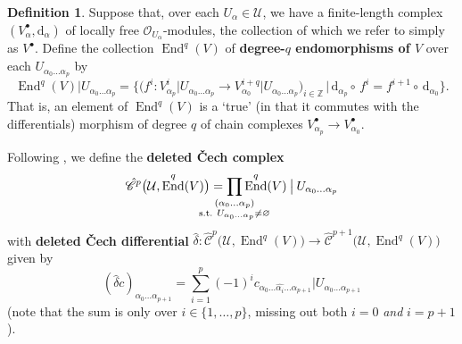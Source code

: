 \documentclass[11pt,fleqn]{article}
\theoremstyle{plain}
\theoremstyle{definition}
\newtheorem{definition}[theorem]{Definition}
\theoremstyle{remark}
\numberwithin{equation}{theorem}
\newcommand{\cover}{\mathcal{U}}
\newcommand{\OO}{\mathcal{O}}
\newcommand{\restricted}{\mathbin{\big\vert}}
\newcommand{\cechd}{\hat{\mathscr{C}}}
\newcommand{\define}[1]{\textbf{#1}}
\renewcommand{\d}{\mathrm{d}}
\DeclareMathOperator{\End}{End}
\begin{document}
        \begin{definition}\label{definition:deleted-cech-etc}
            Suppose that, over each $U_\alpha\in\cover$, we have a finite-length complex $(V_\alpha^\bullet,\d_\alpha)$ of locally free $\OO_{U_\alpha}$-modules, the collection of which we refer to simply as $V^\bullet$.
            Define the collection $\End^q(V)$ of \define{degree-$q$ endomorphisms of $V$} over each $U_{\alpha_0\ldots\alpha_p}$ by
            \begin{equation*}
                \End^q(V)\restricted{U_{\alpha_0\ldots\alpha_p}} = \Big\{\big(f^i\colon V_{\alpha_p}^i\restricted{U_{\alpha_0\ldots\alpha_p}}\to V_{\alpha_0}^{i+q}\restricted{U_{\alpha_0\ldots\alpha_p}}\big)_{i\in\mathbb{Z}} \,\Big|\, \d_{\alpha_p}\circ\,f^i = f^{i+1}\circ\,\d_{\alpha_0}\Big\}.
            \end{equation*}
            That is, an element of $\End^q(V)$ is a `true' (in that it commutes with the differentials) morphism of degree $q$ of chain complexes $V_{\alpha_p}^\bullet\to V_{\alpha_0}^\bullet$.

            Following \cite[0.A]{Green1980}, we define the \define{deleted Čech complex}
            \begin{equation*}
                \cechd^p\big(\cover,\End^q(V)\big)
                =
                \smashoperator{\prod_{\substack{(\alpha_0\ldots\alpha_p)\\\text{s.t. }U_{\alpha_0\ldots\alpha_p}\neq\varnothing}}}
                \End^q(V)\restricted {U_{\alpha_0\ldots\alpha_p}}
            \end{equation*}
            with \define{deleted Čech differential} $\hat{\delta}\colon\cechd^p\big(\cover,\End^q(V)\big) \to \cechd^{p+1}\big(\cover,\End^q(V)\big)$ given by
                \begin{equation*}
                    (\hat{\delta}c)_{\alpha_0\ldots\alpha_{p+1}} = \sum_{i=1}^p(-1)^ic_{\alpha_0\ldots\widehat{\alpha_i}\ldots\alpha_{p+1}}\restricted {U_{\alpha_0\ldots\alpha_{p+1}}}
                \end{equation*}
            (note that the sum is only over $i\in\{1,\ldots,p\}$, missing out both $i=0$ \textit{and} $i=p+1$).
        \end{definition}
\end{document}
